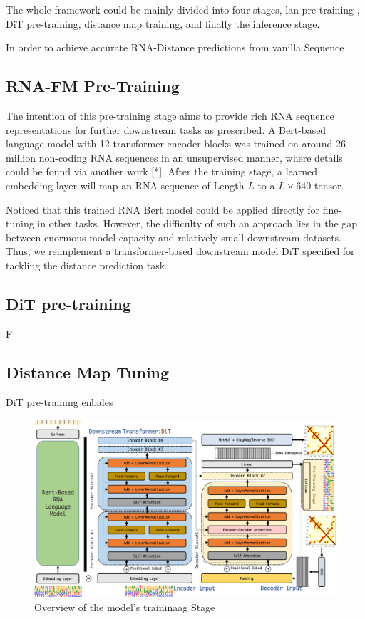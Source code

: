 The whole framework could be mainly divided into four stages, lan pre-training , DiT pre-training, distance map training, and finally the inference stage.


In order to achieve accurate RNA-Distance predictions from vanilla Sequence



\subsection{RNA-FM Pre-Training}

The intention of this pre-training stage aims to provide rich RNA sequence representations for further downstream tasks as prescribed. A Bert-based language model with 12 transformer encoder blocks \cite{devlin2018bert} was trained on around 26 million non-coding RNA sequences in an unsupervised manner, where details could be found via another work [*]. After the training stage, a learned embedding layer will map an RNA sequence of Length $L$  to a $L\times 640$ tensor.

Noticed that this trained RNA Bert model could be applied directly for fine-tuning in other tasks. However, the difficulty of such an approach lies in the gap between enormous model capacity and relatively small downstream datasets. Thus, we reimplement a transformer-based downstream model DiT specified for tackling the distance prediction task.

\subsection{DiT pre-training}

F

\subsection{Distance Map Tuning}
DiT pre-training enbales 


\begin{figure}[]
    \begin{center}
    \includegraphics[width=1.0\textwidth]{1.png}
    \caption{Overview of the model's traininaag Stage}\label{Trainig Stage}
    \end{center}
\end{figure}

